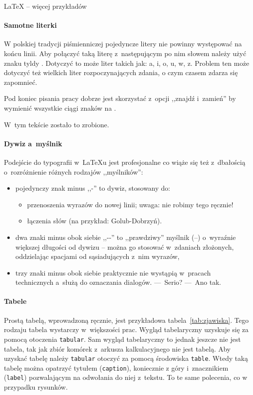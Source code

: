 \begin{easyappendix}{\LaTeX{} -- więcej przykładów}
\paragraph{Samotne literki}

W polskiej tradycji piśmienniczej pojedyncze litery nie powinny występować na końcu linii. Aby połączyć taką literę z~następującym po nim słowem należy użyć znaku tyldy \keys{\textasciitilde{}}. Dotyczyć to może liter takich jak: a, i, o, u, w, z. Problem ten może dotyczyć też wielkich liter rozpoczynających zdania, o czym czasem zdarza się zapomnieć.

Pod koniec pisania pracy dobrze jest skorzystać z~opcji ,,znajdź i~zamień'' by wymienić wszystkie ciągi znaków  na .

W~tym tekście zostało to zrobione.

\paragraph{Dywiz a~myślnik}
Podejście do typografii w~\LaTeX{u} jest profesjonalne co wiąże się też z~dbałością o~rozróżnienie różnych rodzajów ,,myślników'':
\begin{itemize}
	\item pojedynczy znak minus ,,-'' to dywiz, stosowany do:
	\begin{itemize}
		\item przenoszenia wyrazów do nowej linii; uwaga: nie robimy tego ręcznie!
		\item łączenia słów (na przykład: Golub-Dobrzyń).
	\end{itemize}
	\item dwa znaki minus obok siebie ,,-{}-'' %
	to ,,prawdziwy'' myślnik (--) o~wyraźnie większej długości od dywizu -- można go stosować w~zdaniach złożonych, oddzielając spacjami od sąsiadujących z~nim wyrazów,
	\item trzy znaki minus obok siebie praktycznie nie wystąpią w~pracach technicznych a~służą do oznaczania dialogów. ---~Serio? ---~Ano tak.
\end{itemize}

\paragraph{Tabele}
Prostą tabelą, wprowadzoną ręcznie, jest przykładowa tabela~\ref{tab:zjawiska}. Tego rodzaju tabela wystarczy w~większości prac. Wygląd tabelaryczny uzyskuje się za pomocą otoczenia \texttt{tabular}. Sam wygląd tabelaryczny to jednak jeszcze nie jest tabela, tak jak zbiór komórek z~arkusza kalkulacyjnego nie jest tabelą. Aby uzyskać tabelę należy \texttt{tabular} otoczyć za pomocą środowiska \texttt{table}. Wtedy taką tabelę można opatrzyć tytułem (\texttt{caption}), koniecznie z góry i~znacznikiem (\texttt{label}) pozwalającym na odwołania do niej z~tekstu. To te same polecenia, co w przypadku rysunków.


\end{easyappendix}
